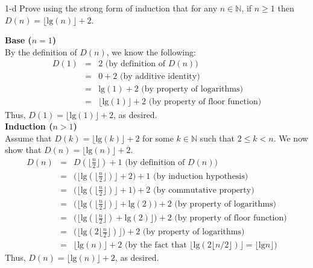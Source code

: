 \documentclass[11pt]{article}
\newcommand{\tlg}{\text{lg}}
\begin{document}
\begin{prob}{1-d}
Prove using the strong form of induction that for any $n \in \mathbb{N}$, if $n \geq 1$ then $D(n) = \lfloor \tlg(n) \rfloor + 2$.
\end{prob}
\begin{sol}
\textbf{Base ($n = 1$)} \\
By the definition of $D(n)$, we know the following:
\begin{eqnarray*}
D(1) & = & 2 \text{ (by definition of $D(n)$)}\\ 
& = & 0 + 2 \text{ (by additive identity)}\\
& = & \tlg(1) + 2 \text{ (by property of logarithms)}\\
& = & \Big\lfloor\tlg(1)\Big\rfloor + 2 \text{ (by property of floor function)}
\end{eqnarray*}
Thus, $D(1) = \lfloor\tlg(1)\rfloor + 2$, as desired. \\

\textbf{Induction ($n > 1$)} \\
Assume that $D(k) = \lfloor\tlg(k)\rfloor + 2$ for some $k \in \mathbb{N}$ such that $2 \leq k < n$. We now show that $D(n) = \lfloor\tlg(n)\rfloor + 2$.
\begin{eqnarray*}
D(n) & = &  D(\Big\lfloor\frac{n}{2}\Big\rfloor) + 1 \text{ (by definition of $D(n)$)}\\
& = & \Big(\Big\lfloor\tlg(\Big\lfloor\frac{n}{2}\Big\rfloor)\Big\rfloor + 2\Big) + 1 \text{ (by induction hypothesis)}\\
& = & \Big(\Big\lfloor\tlg(\Big\lfloor\frac{n}{2}\Big\rfloor)\Big\rfloor + 1\Big) + 2 \text{ (by commutative property)}\\
& = & \Big(\Big\lfloor\tlg(\Big\lfloor\frac{n}{2}\Big\rfloor)\Big\rfloor + \tlg(2)\Big) + 2 \text{ (by property of logarithms)}\\
& = & \Big(\Big\lfloor\tlg(\Big\lfloor\frac{n}{2}\Big\rfloor) + \tlg(2)\Big\rfloor\Big) + 2 \text{ (by property of floor function)}\\
& = & \Big(\Big\lfloor\tlg(2\Big\lfloor\frac{n}{2}\Big\rfloor)\Big\rfloor\Big) + 2 \text{ (by property of logarithms)}\\
& = & \lfloor\tlg(n)\rfloor + 2 \text{ (by the fact that $\lfloor \tlg (2\lfloor n/2 \rfloor)\rfloor = \lfloor \tlg n \rfloor$)} 
%
\end{eqnarray*}
Thus, $D(n) = \lfloor\tlg(n)\rfloor + 2$, as desired.
\end{sol}
\end{document}
